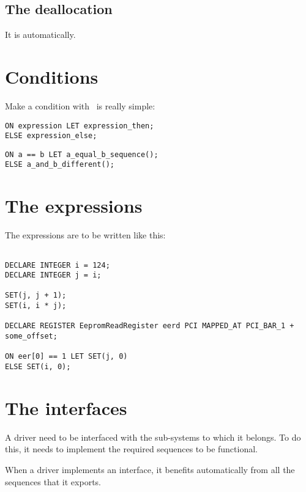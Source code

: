 \documentclass[american]{rtxreport}
\begin{document}
\subsection{The deallocation}
It is automatically.

\section{Conditions}

Make a condition with \rtx\ is really simple:
\begin{lstlisting}[caption=Conditions syntaxe]
ON expression LET expression_then;
ELSE expression_else;
\end{lstlisting}

\begin{lstlisting}[caption=Condition examples]
ON a == b LET a_equal_b_sequence();
ELSE a_and_b_different();
\end{lstlisting}


\section{The expressions}
The expressions are to be written like this:
\begin{lstlisting}[caption=Examples]

DECLARE INTEGER i = 124;
DECLARE INTEGER j = i;

SET(j, j + 1);
SET(i, i * j);

DECLARE REGISTER EepromReadRegister eerd PCI MAPPED_AT PCI_BAR_1 + some_offset;

ON eer[0] == 1 LET SET(j, 0)
ELSE SET(i, 0);

\end{lstlisting}


\section{The interfaces}

A driver need to be interfaced with the sub-systems to which it belongs.
To do this, it needs to implement the required sequences to be functional.

When a driver implements an interface, it benefits automatically from all the sequences that it exports.
\end{document}
